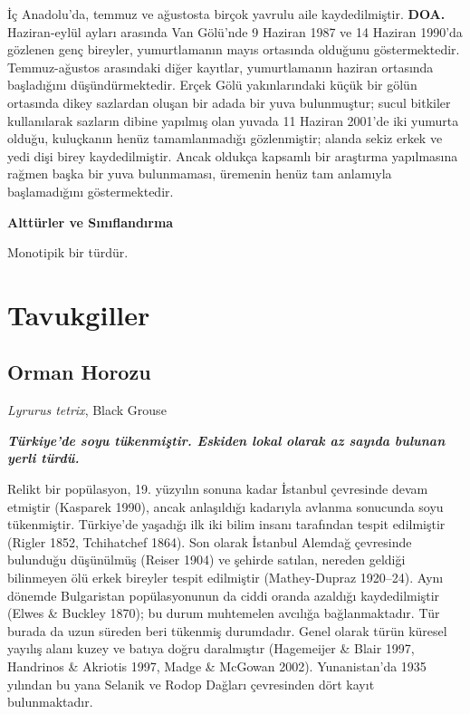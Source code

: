 \documentclass[
  letterpaper,
  DIV=11,
  numbers=noendperiod]{scrreprt}
\begin{document}
İç Anadolu'da, temmuz ve ağustosta birçok yavrulu aile kaydedilmiştir.
\textbf{DOA.} Haziran-eylül ayları arasında Van Gölü'nde 9 Haziran 1987
ve 14 Haziran 1990'da gözlenen genç bireyler, yumurtlamanın mayıs
ortasında olduğunu göstermektedir. Temmuz-ağustos arasındaki diğer
kayıtlar, yumurtlamanın haziran ortasında başladığını düşündürmektedir.
Erçek Gölü yakınlarındaki küçük bir gölün ortasında dikey sazlardan
oluşan bir adada bir yuva bulunmuştur; sucul bitkiler kullanılarak
sazların dibine yapılmış olan yuvada 11 Haziran 2001'de iki yumurta
olduğu, kuluçkanın henüz tamamlanmadığı gözlenmiştir; alanda sekiz erkek
ve yedi dişi birey kaydedilmiştir. Ancak oldukça kapsamlı bir araştırma
yapılmasına rağmen başka bir yuva bulunmaması, üremenin henüz tam
anlamıyla başlamadığını göstermektedir.

\textbf{Alttürler ve Sınıflandırma}

Monotipik bir türdür.


\chapter{Tavukgiller}\label{tavukgiller}

\section{Orman Horozu}\label{orman-horozu}

\emph{Lyrurus tetrix}, Black Grouse

\textbf{\emph{Türkiye'de soyu tükenmiştir. Eskiden lokal olarak az
sayıda bulunan yerli türdü.}}

Relikt bir popülasyon, 19. yüzyılın sonuna kadar İstanbul çevresinde
devam etmiştir (Kasparek 1990), ancak anlaşıldığı kadarıyla avlanma
sonucunda soyu tükenmiştir. Türkiye'de yaşadığı ilk iki bilim insanı
tarafından tespit edilmiştir (Rigler 1852, Tchihatchef 1864). Son olarak
İstanbul Alemdağ çevresinde bulunduğu düşünülmüş (Reiser 1904) ve
şehirde satılan, nereden geldiği bilinmeyen ölü erkek bireyler tespit
edilmiştir (Mathey-Dupraz 1920--24). Aynı dönemde Bulgaristan
popülasyonunun da ciddi oranda azaldığı kaydedilmiştir (Elwes \& Buckley
1870); bu durum muhtemelen avcılığa bağlanmaktadır. Tür burada da uzun
süreden beri tükenmiş durumdadır. Genel olarak türün küresel yayılış
alanı kuzey ve batıya doğru daralmıştır (Hagemeijer \& Blair 1997,
Handrinos \& Akriotis 1997, Madge \& McGowan 2002). Yunanistan'da 1935
yılından bu yana Selanik ve Rodop Dağları çevresinden dört kayıt
bulunmaktadır.
\end{document}
